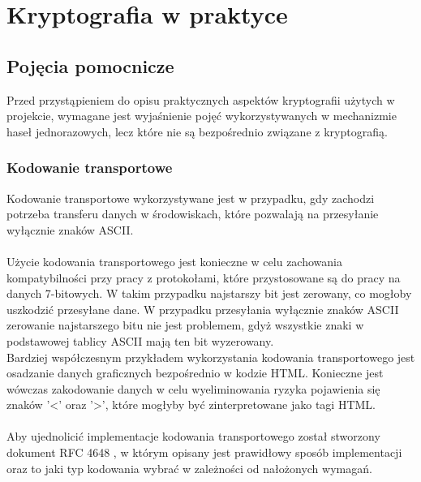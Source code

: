 \chapter{Kryptografia w praktyce}

\section{Pojęcia pomocnicze}
Przed przystąpieniem do opisu praktycznych aspektów kryptografii użytych w projekcie, wymagane jest 
wyjaśnienie pojęć wykorzystywanych w mechanizmie haseł jednorazowych, lecz które nie są bezpośrednio 
związane z kryptografią. 

\subsection{Kodowanie transportowe}
Kodowanie transportowe wykorzystywane jest w przypadku, gdy zachodzi potrzeba transferu danych
w środowiskach, które pozwalają na przesyłanie wyłącznie znaków ASCII. \\ \\
Użycie kodowania transportowego jest konieczne w celu zachowania kompatybilności przy pracy z protokołami, 
które przystosowane są do pracy na danych 7-bitowych. W takim przypadku najstarszy bit jest zerowany, co
mogłoby uszkodzić przesyłane dane. W przypadku przesyłania wyłącznie znaków ASCII zerowanie najstarszego bitu
nie jest problemem, gdyż wszystkie znaki w podstawowej tablicy ASCII mają ten bit wyzerowany.\\
Bardziej współczesnym przykładem wykorzystania kodowania transportowego jest osadzanie danych graficznych bezpośrednio w kodzie HTML. Konieczne jest wówczas zakodowanie danych w celu wyeliminowania ryzyka pojawienia się znaków '<' oraz '>', które mogłyby być zinterpretowane jako tagi HTML. \\ \\
Aby ujednolicić implementacje kodowania transportowego został stworzony dokument RFC 4648 \cite{encoding}, w którym opisany jest prawidłowy sposób implementacji oraz to jaki typ kodowania wybrać w zależności od nałożonych wymagań.

